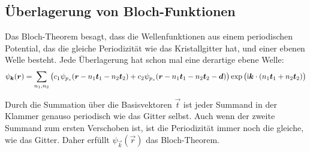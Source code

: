 \subsection{Überlagerung von Bloch-Funktionen}

Das Bloch-Theorem besagt, dass die Wellenfunktionen aus einem periodischen
Potential, das die gleiche Periodizität wie das Kristallgitter hat, und einer
ebenen Welle besteht. Jede Überlagerung hat schon mal eine derartige ebene
Welle:
\[
	\psi_{\vec k} (\vec r)
	= 
	\sum_{n_1, n_2} \del{c_1 \psi_{p_z} (\vec r - n_1 \vec t_1 - n_2 \vec t_2) + c_2 \psi_{p_z} (\vec r - n_1 \vec t_1 - n_2 \vec t_2 - \vec d)} \exp\del{\ii \vec k \cdot (n_1 \vec t_1 + n_2 \vec t_2)}
\]

Durch die Summation über die Basisvektoren $\vec t$ ist jeder Summand in der
Klammer genauso periodisch wie das Gitter selbst. Auch wenn der zweite Summand
zum ersten Verschoben ist, ist die Periodizität immer noch die gleiche, wie das
Gitter. Daher erfüllt $\psi_{\vec k}(\vec r)$ das Bloch-Theorem.


\IfFileExists{\bibliographyfile}{
	
}{}



